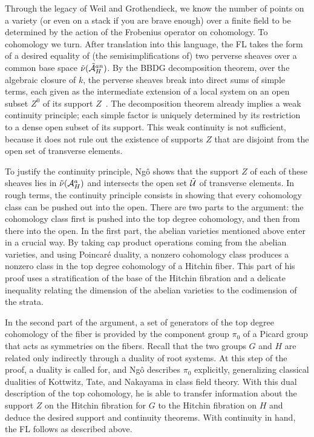 Through the legacy of Weil and Grothendieck, we know the number of
points on a variety (or even on a stack if you are brave enough) over
a finite field to be determined by the action of the Frobenius operator on
cohomology.  To cohomology we turn.  After translation into this
language, the FL takes the form of a desired equality of (the semisimplifications of) two perverse
sheaves over a common base space $\tilde\nu(\tilde\AA^{an}_H)$.  By the
BBDG decomposition theorem, over the algebraic closure of $k$, the
perverse sheaves break into  direct sums of simple terms, each given
as the intermediate extension of a local system on an open subset
$Z^0$ of its support $Z$~\cite{BBDG:1982}.  The decomposition theorem
already implies a weak continuity principle; each simple factor is
uniquely determined by its restriction to a dense open subset of its
support.  This weak continuity is not sufficient, because it does not
rule out the existence of supports $Z$ that are disjoint from the open
set of transverse elements.

To justify the continuity principle, Ng\^o shows that the support $Z$
of each of these sheaves lies in $\tilde\nu(\AA^a_H)$ and
intersects the open set $\tilde\UU$ of transverse
elements.  In rough terms, the continuity principle consists in
showing that every cohomology class can be pushed out into the open.
There are two parts to the argument: the cohomology class first is
pushed into the top degree cohomology, and then from there into the
open.  In the first part, the abelian varieties mentioned above enter
in a crucial way.  By taking cap product operations coming from the
abelian varieties, and using Poincar\'e duality, a nonzero cohomology
class produces a nonzero class in the top degree cohomology of a Hitchin
fiber.  This part of his proof uses a stratification of the base of
the Hitchin fibration and a delicate inequality relating the dimension
of the abelian varieties to the codimension of the strata.

In the second part of the argument, a set of generators of the top
degree cohomology of the fiber is provided by the component group
$\pi_0$ of a Picard group that acts as symmetries on the fibers.
Recall that the two groups $G$ and $H$ are related only indirectly
through a duality of root systems.  At this step of the proof, a
duality is called for, and Ng\^o describes $\pi_0$ explicitly,
generalizing classical dualities of Kottwitz, Tate, and Nakayama in
class field theory.  With this dual description of the top cohomology,
he is able to transfer information about the support $Z$ on the
Hitchin fibration for $G$ to the Hitchin fibration on $H$ and deduce
the desired support and continuity theorems.  With continuity in hand,
the FL follows as described above.

